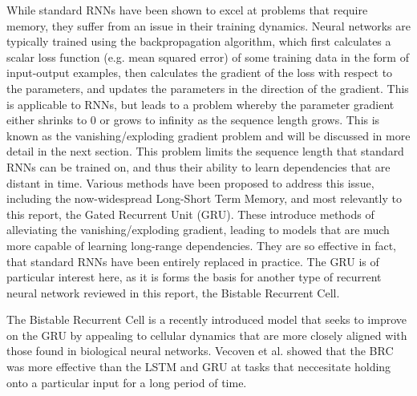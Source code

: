 While standard RNNs have been shown to excel at problems that require memory, they suffer from an issue in their training dynamics.
Neural networks are typically trained using the backpropagation algorithm, which first calculates a scalar loss function (e.g. mean squared error) of some training data in the form of input-output examples, then calculates the gradient of the loss with respect to the parameters, and updates the parameters in the direction of the gradient. This is applicable to RNNs, but leads to a problem whereby the parameter gradient either shrinks to 0 or grows to infinity as the sequence length grows. This is known as the vanishing/exploding gradient problem and will be discussed in more detail in the next section. This problem limits the sequence length that standard RNNs can be trained on, and thus their ability to learn dependencies that are distant in time.
Various methods have been proposed to address this issue, including the now-widespread Long-Short Term Memory\cite{hochreiter1997lstm}, and most relevantly to this report, the Gated Recurrent Unit\cite{cho2014gru} (GRU). These introduce methods of alleviating the vanishing/exploding gradient, leading to models that are much more capable of learning long-range dependencies. They are so effective in fact, that standard RNNs have been entirely replaced in practice. The GRU is of particular interest here, as it is forms the basis for another type of recurrent neural network reviewed in this report, the Bistable Recurrent Cell\cite{vecoven2021brc}.

The Bistable Recurrent Cell is a recently introduced model that seeks to improve on the GRU by appealing to cellular dynamics that are more closely aligned with those found in biological neural networks. Vecoven et al.\cite{vecoven2021brc} showed that the BRC was more effective than the LSTM and GRU at tasks that neccesitate holding onto a particular input for a long period of time.